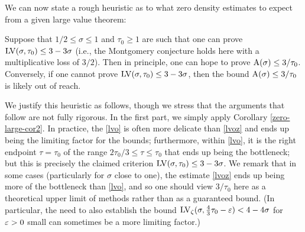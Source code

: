 We can now state a rough heuristic as to what zero density estimates to expect from a given large value theorem:

\begin{heuristic}\label{lv-heuristic} Suppose that $1/2 \leq \sigma \leq 1$ and $\tau_0 \geq 1$ are such that one can prove $\mathrm{LV}(\sigma, \tau_0) \leq 3-3\sigma$ (i.e., the Montgomery conjecture holds here with a multiplicative loss of $3/2$).  Then in principle, one can hope to prove $\mathrm{A}(\sigma) \leq 3/\tau_0$.  Conversely, if one cannot prove $\mathrm{LV}(\sigma, \tau_0) \leq 3-3\sigma$, then the bound $\mathrm{A}(\sigma) \leq 3/\tau_0$ is likely out of reach.
\end{heuristic}

We justify this heuristic as follows, though we stress that the arguments that follow are not fully rigorous.  In the first part, we simply apply Corollary \ref{zero-large-cor2}.  In practice, the \eqref{lvo} is often more delicate than \eqref{lvoz} and ends up being the limiting factor for the bounds; furthermore, within \eqref{lvo}, it is the right endpoint $\tau=\tau_0$ of the range $2\tau_0/3 \leq \tau \leq \tau_0$ that ends up being the bottleneck; but this is precisely the claimed criterion $\mathrm{LV}(\sigma, \tau_0) \leq 3-3\sigma$.  We remark that in some cases (particularly for $\sigma$ close to one), the estimate \eqref{lvoz} ends up being more of the bottleneck than \eqref{lvo}, and so one should view $3/\tau_0$ here as a theoretical upper limit of methods rather than as a guaranteed bound.  (In particular, the need to also establish the bound $\mathrm{LV}_\zeta(\sigma, \frac{4}{3}\tau_0-\varepsilon) < 4-4\sigma$ for $\varepsilon>0$ small can sometimes be a more limiting factor.)

